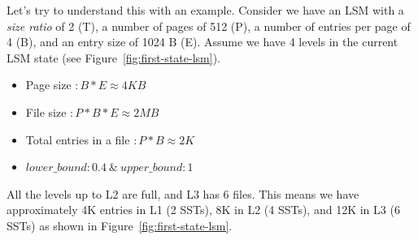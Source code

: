 Let's try to understand this with an example. Consider we have an LSM with a \textit{size ratio} of 2 (T), a number
of pages of 512 (P), a number of entries per page of 4 (B), and an entry size of 1024 B (E). Assume we have 4 levels in 
the current LSM state (see Figure~\ref{fig:first-state-lsm}).

\begin{itemize}
    \item Page size $\colon B * E \approx 4 KB$
    \item File size $\colon P * B * E \approx 2 MB$
    \item Total entries in a file $\colon P * B \approx 2 K$
    \item $lower\_bound \colon 0.4\ \&\ upper\_bound \colon 1$ 
\end{itemize}

All the levels up to L2 are full, and L3 has 6 files. This means we have approximately 4K entries in L1 (2 SSTs), 8K in 
L2 (4 SSTs), and 12K in L3 (6 SSTs) as shown in Figure~\ref{fig:first-state-lsm}.


